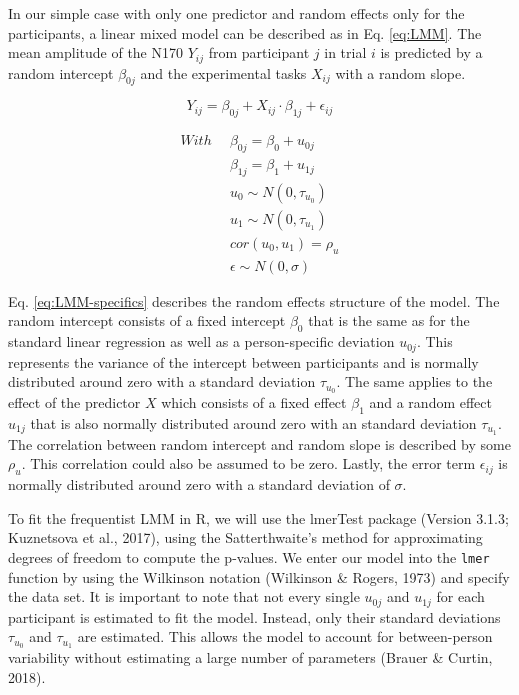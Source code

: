 \documentclass[
  doc,12pt,floatsintext]{apa7}
\begin{document}
In our simple case with only one predictor and random effects only for the participants, a linear mixed model can be described as in Eq. \eqref{eq:LMM}. The mean amplitude of the N170 \(Y_{ij}\) from participant \(j\) in trial \(i\) is predicted by a random intercept \(\beta_{0j}\) and the experimental tasks \(X_{ij}\) with a random slope.

\begin{equation} 
Y_{ij} = \beta_{0j} + X_{ij} \cdot \beta_{1j} + \epsilon_{ij}
\label{eq:LMM}
\end{equation}

\begin{equation} 
\begin{split}
With \enspace & \beta_{0j} = \beta_{0} + u_{0j} \\
& \beta_{1j} = \beta_{1} + u_{1j} \\
& u_0 \sim N(0, \tau_{u_0}) \\
& u_1 \sim N(0, \tau_{u_1}) \\
& cor(u_0, u_1) = \rho_u \\
& \epsilon \sim N(0, \sigma)
\end{split}
\label{eq:LMM-specifics}
\end{equation}

Eq. \eqref{eq:LMM-specifics} describes the random effects structure of the model. The random intercept consists of a fixed intercept \(\beta_{0}\) that is the same as for the standard linear regression as well as a person-specific deviation \(u_{0j}\). This represents the variance of the intercept between participants and is normally distributed around zero with a standard deviation \(\tau_{u_0}\). The same applies to the effect of the predictor \(X\) which consists of a fixed effect \(\beta_{1}\) and a random effect \(u_{1j}\) that is also normally distributed around zero with an standard deviation \(\tau_{u_1}\). The correlation between random intercept and random slope is described by some \(\rho_u\). This correlation could also be assumed to be zero. Lastly, the error term \(\epsilon_{ij}\) is normally distributed around zero with a standard deviation of \(\sigma\).

To fit the frequentist LMM in R, we will use the lmerTest package (Version 3.1.3; Kuznetsova et al., 2017), using the Satterthwaite's method for approximating degrees of freedom to compute the p-values. We enter our model into the \texttt{lmer} function by using the Wilkinson notation (Wilkinson \& Rogers, 1973) and specify the data set. It is important to note that not every single \(u_{0j}\) and \(u_{1j}\) for each participant is estimated to fit the model. Instead, only their standard deviations \(\tau_{u_0}\) and \(\tau_{u_1}\) are estimated. This allows the model to account for between-person variability without estimating a large number of parameters (Brauer \& Curtin, 2018).
\end{document}
